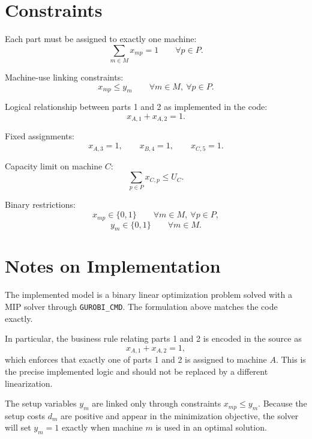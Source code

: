 \section*{Constraints}

Each part must be assigned to exactly one machine:
\[
\sum_{m \in M} x_{mp} = 1
\qquad \forall p \in P.
\]

Machine-use linking constraints:
\[
x_{mp} \le y_m
\qquad \forall m \in M,\ \forall p \in P.
\]

Logical relationship between parts 1 and 2 as implemented in the code:
\[
x_{A,1} + x_{A,2} = 1.
\]

Fixed assignments:
\[
x_{A,3} = 1,
\qquad
x_{B,4} = 1,
\qquad
x_{C,5} = 1.
\]

Capacity limit on machine $C$:
\[
\sum_{p \in P} x_{C,p} \le U_C.
\]

Binary restrictions:
\[
x_{mp} \in \{0,1\}
\qquad \forall m \in M,\ \forall p \in P,
\]
\[
y_m \in \{0,1\}
\qquad \forall m \in M.
\]

\section*{Notes on Implementation}

The implemented model is a binary linear optimization problem solved with a MIP solver through \texttt{GUROBI\_CMD}. The formulation above matches the code exactly.

In particular, the business rule relating parts 1 and 2 is encoded in the source as
\[
x_{A,1}+x_{A,2}=1,
\]
which enforces that exactly one of parts 1 and 2 is assigned to machine $A$. This is the precise implemented logic and should not be replaced by a different linearization.

The setup variables $y_m$ are linked only through constraints $x_{mp}\le y_m$. Because the setup costs $d_m$ are positive and appear in the minimization objective, the solver will set $y_m=1$ exactly when machine $m$ is used in an optimal solution.
